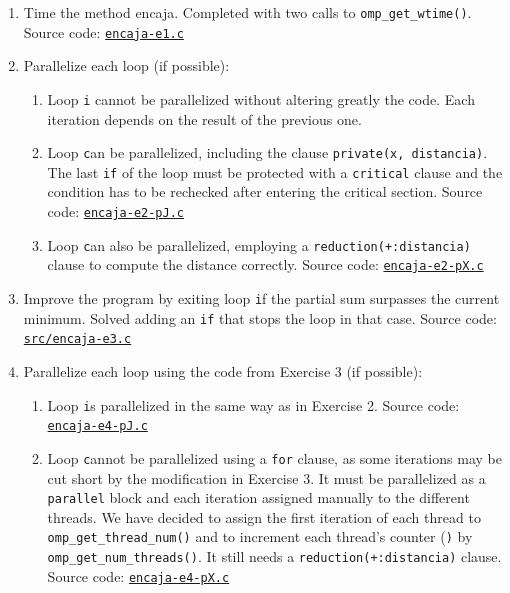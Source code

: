 \documentclass[a4paper]{article}
\newcommand{\github}{https://github.com/kauron/etsinf3/tree/master/CPA/lab2}
\newcommand{\gitline}[2]{\texttt{\href{\github /src/#1#2}{#1}}}
\newcommand{\m}[1]{\texttt{#1}}
\newcommand{\x}[1]{\m{#1}}
\renewcommand{\j}[1]{\m{#1}}
\begin{document}
\begin{enumerate}
    \item Time the method encaja. Completed with two calls to \m{omp\_get\_wtime()}. Source code: \gitline{encaja-e1.c}{\#L167}
    \item Parallelize each loop (if possible):
    \begin{enumerate}
        \item Loop \m{i} cannot be parallelized without altering greatly the code\footnotemark. Each iteration depends on the result of the previous one.
        \item Loop \j can be parallelized, including the clause \m{private(x, distancia)}. The last \m{if} of the loop must be protected with a \m{critical} clause and the condition has to be rechecked after entering the critical section. Source code: \gitline{encaja-e2-pJ.c}{\#L118}
        \item Loop \x can also be parallelized, employing a \m{reduction(+:distancia)} clause to compute the distance correctly. Source code: \gitline{encaja-e2-pX.c}{\#L120}
    \end{enumerate}
    \item Improve the program by exiting loop \x if the partial sum surpasses the current minimum. Solved adding an \m{if} that stops the loop in that case. Source code: \gitline{src/encaja-e3.c}{\#L122}
    \item Parallelize each loop using the code from Exercise 3 (if possible):
    \begin{enumerate}
        \item Loop \j is parallelized in the same way as in Exercise 2. Source code: \gitline{encaja-e4-pJ.c}{\#L118}
        \item Loop \x cannot be parallelized using a \m{for} clause, as some iterations may be cut short by the modification in Exercise 3. It must be parallelized as a \m{parallel} block and each iteration assigned manually to the different threads. We have decided to assign the first iteration of each thread to \m{omp\_get\_thread\_num()} and to increment each thread's counter (\x) by \m{omp\_get\_num\_threads()}. It still needs a \m{reduction(+:distancia)} clause. Source code: \gitline{encaja-e4-pX.c}{\#L120}
    \end{enumerate}
\end{enumerate}
\end{document}
